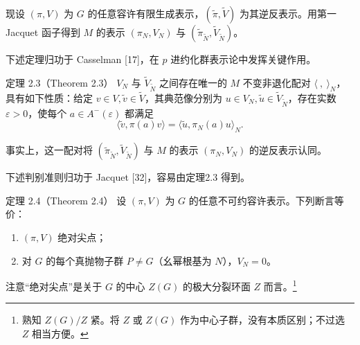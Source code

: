 现设 $(\pi,V)$ 为 $G$ 的任意容许有限生成表示，$(\widetilde\pi,\widetilde V)$ 为其逆反表示。用第一 Jacquet 函子得到 $M$ 的表示 $(\pi_N,V_N)$ 与 $(\widetilde\pi_{\widetilde N},\widetilde V_{\widetilde N})$。

下述定理归功于 Casselman [17]，在 $p$ 进约化群表示论中发挥关键作用。
\begin{originaltheorem}{定理 2.3（Theorem 2.3）}
$V_N$ 与 $\widetilde V_{\widetilde N}$ 之间存在唯一的 $M$ 不变非退化配对 $\langle\ ,\ \rangle_N$，具有如下性质：给定 $v\in V,\widetilde v\in\widetilde V$，其典范像分别为 $u\in V_N,\widetilde u\in\widetilde V_{\widetilde N}$，存在实数 $\varepsilon>0$，使每个 $a\in A^-(\varepsilon)$ 都满足
\[
\langle\widetilde v,\pi(a)v\rangle=\langle\widetilde u,\pi_N(a)u\rangle_N.\tag{4}
\]
\end{originaltheorem}
事实上，这一配对将 $(\widetilde\pi_{\widetilde N},\widetilde V_{\widetilde N})$ 与 $M$ 的表示 $(\pi_N,V_N)$ 的逆反表示认同。

下述判别准则归功于 Jacquet [32]，容易由定理2.3 得到。
\begin{originaltheorem}{定理 2.4（Theorem 2.4）}
设 $(\pi,V)$ 为 $G$ 的任意不可约容许表示。下列断言等价：
\begin{enumerate}
\item[(1)] $(\pi,V)$ 绝对尖点；
\item[(2)] 对 $G$ 的每个真抛物子群 $P\ne G$（幺幂根基为 $N$），$V_N=0$。
\end{enumerate}
\end{originaltheorem}
注意“绝对尖点”是关于 $G$ 的中心 $Z(G)$ 的极大分裂环面 $Z$ 而言。\footnote{熟知 $Z(G)/Z$ 紧。将 $Z$ 或 $Z(G)$ 作为中心子群，没有本质区别；不过选 $Z$ 相当方便。}

